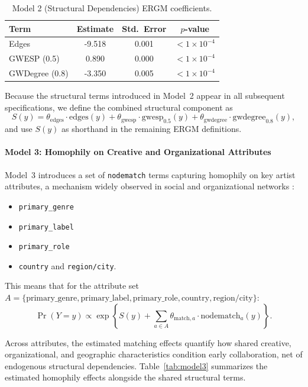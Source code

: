 \documentclass[fleqn,10pt]{wlscirep}
\begin{document}
\begin{table}[h!]
\centering
\caption{Model 2 (Structural Dependencies) ERGM coefficients.}
\footnotesize
\begin{tabular}{lccc}
\hline
Term & Estimate & Std.\ Error & $p$-value \\
\hline
Edges & -9.518 & 0.001 & $< 1 \times 10^{-4}$ \\
GWESP (0.5) & 0.890 & 0.000 & $< 1 \times 10^{-4}$ \\
GWDegree (0.8) & -3.350 & 0.005 & $< 1 \times 10^{-4}$ \\
\hline
\end{tabular}
\label{tab:model2}
\end{table}

Because the structural terms introduced in Model~2 appear in all subsequent specifications, we define the combined structural component as
\[
S(y) = 
\theta_{\text{edges}} \cdot \text{edges}(y)
+ \theta_{\text{gwesp}} \cdot \text{gwesp}_{0.5}(y)
+ \theta_{\text{gwdegree}} \cdot \text{gwdegree}_{0.8}(y),
\]
and use $S(y)$ as shorthand in the remaining ERGM definitions.

\paragraph*{Model 3: Homophily on Creative and Organizational Attributes}
Model~3 introduces a set of \texttt{nodematch} terms capturing homophily on key artist attributes, a mechanism widely observed in social and organizational networks \cite{Wasserman1994SNA}:
\begin{itemize}
    \item \texttt{primary\_genre}
    \item \texttt{primary\_label}
    \item \texttt{primary\_role}
    \item \texttt{country} and \texttt{region/city}.
\end{itemize}

This means that for the attribute set $A = \{\text{primary\_genre}, \text{primary\_label}, \text{primary\_role}, \text{country}, \text{region/city}\}$:
\begin{equation}
\Pr(Y = y) \propto
\exp\left\{
    S(y)
    + \sum_{a \in A} 
        \theta_{\text{match},a} \cdot \text{nodematch}_a(y)
\right\}.
\label{eq:model2-compact}
\end{equation}

Across attributes, the estimated matching effects quantify how shared creative, organizational, and geographic characteristics condition early collaboration, net of endogenous structural dependencies. Table~\ref{tab:model3} summarizes the estimated homophily effects alongside the shared structural terms.
\end{document}
